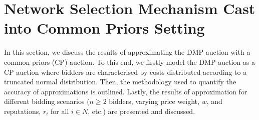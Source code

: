 

\section{Network Selection Mechanism Cast into Common Priors Setting} %
\label{sec:network_selection_mechanism_cast_into_common_priors_setting_approximation}
In this section, we discuss the results of approximating the DMP auction with a common priors (CP) auction. To this end, we firstly model the DMP auction as a CP auction where bidders are characterised by costs distributed according to a truncated normal distribution. Then, the methodology used to quantify the accuracy of approximations is outlined. Lastly, the results of approximation for different bidding scenarios ($n\geq 2$ bidders, varying price weight, $w$, and reputations, $r_i$ for all $i\in N$, etc.) are presented and discussed.

